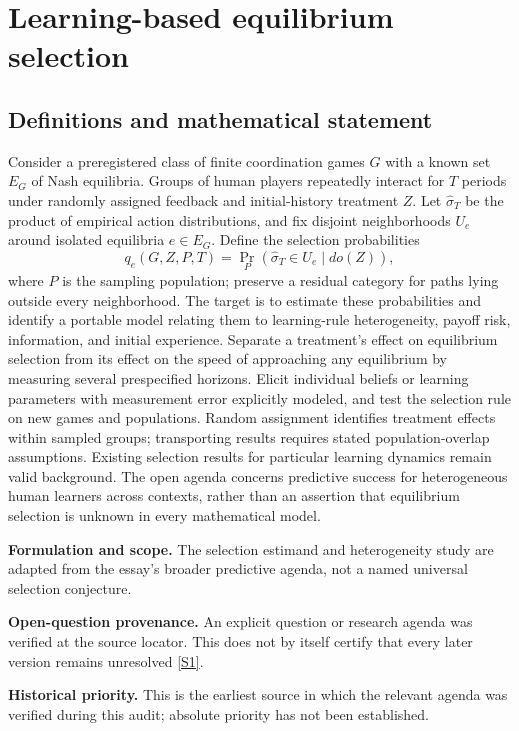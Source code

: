 \documentclass[11pt]{article}
\newcommand{\sref}[2]{\hyperlink{source:#1:#2}{[S#2]}}
\begin{document}
\section*{Learning-based equilibrium selection}\label{30007563}
\subsection{Definitions and mathematical statement}
Consider a preregistered class of finite coordination games \(G\) with a known set \(E_G\) of Nash equilibria. Groups of human players repeatedly interact for \(T\) periods under randomly assigned feedback and initial-history treatment \(Z\). Let \(\widehat\sigma_T\) be the product of empirical action distributions, and fix disjoint neighborhoods \(U_e\) around isolated equilibria \(e\in E_G\). Define the selection probabilities
\[
 q_e(G,Z,P,T)=\Pr_P(\widehat\sigma_T\in U_e\mid do(Z)),
\]
where \(P\) is the sampling population; preserve a residual category for paths lying outside every neighborhood. The target is to estimate these probabilities and identify a portable model relating them to learning-rule heterogeneity, payoff risk, information, and initial experience. Separate a treatment's effect on equilibrium selection from its effect on the speed of approaching any equilibrium by measuring several prespecified horizons. Elicit individual beliefs or learning parameters with measurement error explicitly modeled, and test the selection rule on new games and populations. Random assignment identifies treatment effects within sampled groups; transporting results requires stated population-overlap assumptions. Existing selection results for particular learning dynamics remain valid background. The open agenda concerns predictive success for heterogeneous human learners across contexts, rather than an assertion that equilibrium selection is unknown in every mathematical model.

\par\textbf{Formulation and scope.} The selection estimand and heterogeneity study are adapted from the essay’s broader predictive agenda, not a named universal selection conjecture.

\par\textbf{Open-question provenance.} An explicit question or research agenda was verified at the source locator. This does not by itself certify that every later version remains unresolved \sref{30007563}{1}.

\par\textbf{Historical priority.} This is the earliest source in which the relevant agenda was verified during this audit; absolute priority has not been established.
\end{document}

